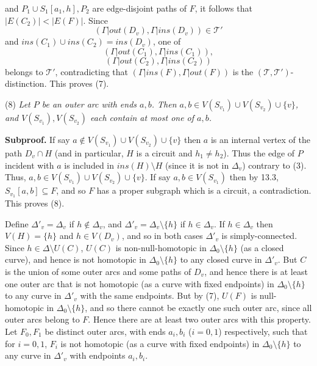 \noindent and $P_1 \cup S_1[a_1, h], P_2$ are edge-disjoint paths of $F$, it follows that $|E(C_2)| < |E(F)|$. Since
\begin{equation*}
(\Gamma|out(D_v), \Gamma|ins(D_v)) \in \mathscr{T}'
\end{equation*}
and $ins(C_1) \cup ins(C_2) = ins(D_v)$, one of
\begin{equation*}
(\Gamma|out(C_1), \Gamma|ins(C_1)),
\end{equation*}
\begin{equation*}
(\Gamma|out(C_2), \Gamma|ins(C_2))
\end{equation*}
belongs to $\mathscr{T}'$, contradicting that $(\Gamma|ins(F), \Gamma|out(F))$ is the $(\mathscr{T}, \mathscr{T}')$-distinction. This proves (7).

\hspace*{12pt}(8) \textit{Let $P$ be an outer arc with ends $a, b$. Then $a, b \in V(S_{v_1}) \cup V(S_{v_2}) \cup \{v\}$, and $V(S_{v_1}), V(S_{v_2})$ each contain at most one of $a, b$.}

\textbf{Subproof.} If say $a \notin V(S_{v_1}) \cup V(S_{v_2}) \cup \{v\}$ then $a$ is an internal vertex of the path $D_v \cap H$ (and in particular, $H$ is a circuit and $h_1 \ne h_2$). Thus the edge of $P$ incident with $a$ is included in $ins(H) \setminus H$ (since it is not in $\Delta_v$) contrary to (3). Thus, $a, b \in V(S_{v_1}) \cup V(S_{v_2}) \cup \{v\}$. If say $a, b \in V(S_{v_1})$ then by 13.3, $S_{v_1}[a, b] \subseteq F$, and so $F$ has a proper subgraph which is a circuit, a contradiction. This proves (8).

Define $\Delta'_v = \Delta_v$ if $h \notin \Delta_v$, and $\Delta'_v = \Delta_v \setminus \{h\}$ if $h \in \Delta_v$. If $h \in \Delta_v$ then $V(H) = \{h\}$ and $h \in V(D_v)$, and so in both cases $\Delta'_v$ is simply-connected. Since $h \in \Delta \setminus U(C)$, $U(C)$ is non-null-homotopic in $\Delta_0 \setminus \{h\}$ (as a closed curve), and hence is not homotopic in $\Delta_0 \setminus \{h\}$ to any closed curve in $\Delta'_v$. But $C$ is the union of some outer arcs and some paths of $D_v$, and hence there is at least one outer arc that is not homotopic (as a curve with fixed endpoints) in $\Delta_0 \setminus \{h\}$ to any curve in $\Delta'_v$ with the same endpoints. But by (7), $U(F)$ is null-homotopic in $\Delta_0 \setminus \{h\}$, and so there cannot be exactly one such outer arc, since all outer arcs belong to $F$. Hence there are at least two outer arcs with this property. Let $F_0, F_1$ be distinct outer arcs, with ends $a_i, b_i$ ($i = 0, 1$) respectively, such that for $i = 0, 1$, $F_i$ is not homotopic (as a curve with fixed endpoints) in $\Delta_0 \setminus \{h\}$ to any curve in $\Delta'_v$ with endpoints $a_i, b_i$.

